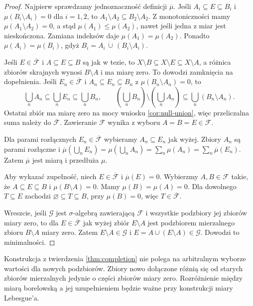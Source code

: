 \begin{proof}
Najpierw sprawdzamy jednoznaczność definicji $\overline\mu$.
Jeśli $A_i\subseteq E\subseteq B_i$ i
$\mu(B_i\setminus A_i)=0$ dla $i=1,2$, to
$A_1\setminus A_2\subseteq B_2\setminus A_2$.
Z monotoniczności mamy $\mu(A_1\setminus A_2)=0$,
a stąd $\mu(A_1)\leq\mu(A_2)$, nawet jeśli
jedna z miar jest nieskończona. Zamiana indeksów
daje $\mu(A_1)=\mu(A_2)$. Ponadto
$\mu(A_i)=\mu(B_i)$, gdyż
$B_i=A_i\,\dot\cup\,(B_i\setminus A_i)$.

Jeśli $E\in\overline{\mathcal F}$ i
$A\subseteq E\subseteq B$ są jak w tezie, to
$X\setminus B\subseteq X\setminus E\subseteq X\setminus A$,
a różnica zbiorów skrajnych wynosi $B\setminus A$
i ma miarę zero. To dowodzi zamknięcia na dopełnienia.
Jeśli $E_n\in\overline{\mathcal F}$ i
$A_n\subseteq E_n\subseteq B_n$ z
$\mu(B_n\setminus A_n)=0$, to
\[
\bigcup_nA_n\subseteq\bigcup_nE_n\subseteq\bigcup_nB_n,
\qquad
\left(\bigcup_nB_n\right)\setminus\left(\bigcup_nA_n\right)
\subseteq\bigcup_n(B_n\setminus A_n).
\]
Ostatni zbiór ma miarę zero na mocy wniosku
\ref{cor:null-union}, więc przeliczalna suma należy do
$\overline{\mathcal F}$. Zawieranie $\mathcal F$ wynika
z wyboru $A=B=E\in\mathcal F$.

Dla parami rozłącznych $E_n\in\overline{\mathcal F}$
wybieramy $A_n\subseteq E_n$ jak wyżej. Zbiory $A_n$
są parami rozłączne i
$\overline\mu(\bigcup_nE_n)=\mu(\bigcup_nA_n)
=\sum_n\mu(A_n)=\sum_n\overline\mu(E_n)$.
Zatem $\overline\mu$ jest miarą i przedłuża $\mu$.

Aby wykazać zupełność, niech $E\in\overline{\mathcal F}$
i $\overline\mu(E)=0$. Wybierzmy $A,B\in\mathcal F$
takie, że $A\subseteq E\subseteq B$ i
$\mu(B\setminus A)=0$. Mamy $\mu(B)=\mu(A)=0$.
Dla dowolnego $T\subseteq E$ zachodzi
$\varnothing\subseteq T\subseteq B$, przy $\mu(B)=0$,
więc $T\in\overline{\mathcal F}$.

Wreszcie, jeśli $\mathcal G$ jest $\sigma$-algebrą zawierającą
$\mathcal F$ i wszystkie podzbiory jej zbiorów miary zero,
to dla $E\in\overline{\mathcal F}$ jak wyżej zbiór
$E\setminus A$ jest podzbiorem mierzalnego zbioru
$B\setminus A$ miary zero. Zatem $E\setminus A\in\mathcal G$
i $E=A\cup(E\setminus A)\in\mathcal G$. Dowodzi to minimalności.
\end{proof}

\begin{uwaga}
Konstrukcja z twierdzenia \ref{thm:completion} nie polega
na arbitralnym wyborze wartości dla nowych podzbiorów.
Zbiory nowo dołączone różnią się od starych zbiorów
mierzalnych jedynie o części zbiorów miary zero.
Rozróżnienie między miarą borelowską a jej uzupełnieniem
będzie ważne przy konstrukcji miary Lebesgue'a.
\end{uwaga}

